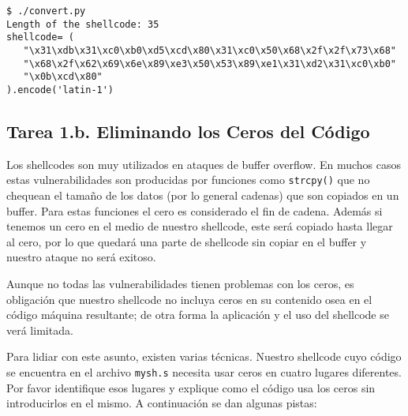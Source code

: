 \begin{lstlisting}
$ ./convert.py
Length of the shellcode: 35
shellcode= (
   "\x31\xdb\x31\xc0\xb0\xd5\xcd\x80\x31\xc0\x50\x68\x2f\x2f\x73\x68"
   "\x68\x2f\x62\x69\x6e\x89\xe3\x50\x53\x89\xe1\x31\xd2\x31\xc0\xb0"
   "\x0b\xcd\x80"
).encode('latin-1')
\end{lstlisting}



\subsection{Tarea 1.b. Eliminando los Ceros del Código}


Los shellcodes son muy utilizados en ataques de buffer overflow. En muchos casos estas vulnerabilidades son producidas por funciones como \texttt{strcpy()} que no chequean el tamaño de los datos (por lo general cadenas) que son copiados en un buffer. Para estas funciones el cero es considerado el fin de cadena. Además si tenemos un cero en el medio de nuestro shellcode, este será copiado hasta llegar al cero, por lo que quedará una parte de shellcode sin copiar en el buffer y nuestro ataque no será exitoso.

Aunque no todas las vulnerabilidades tienen problemas con los ceros, es obligación que nuestro shellcode no incluya ceros en su contenido osea en el código máquina resultante; de otra forma la aplicación y el uso del shellcode se verá limitada.

Para lidiar con este asunto, existen varias técnicas. Nuestro shellcode cuyo código se encuentra en el archivo \texttt{mysh.s} necesita usar ceros en cuatro lugares diferentes. Por favor identifique esos lugares y explique como el código usa los ceros sin introducirlos en el mismo. A continuación se dan algunas pistas:


